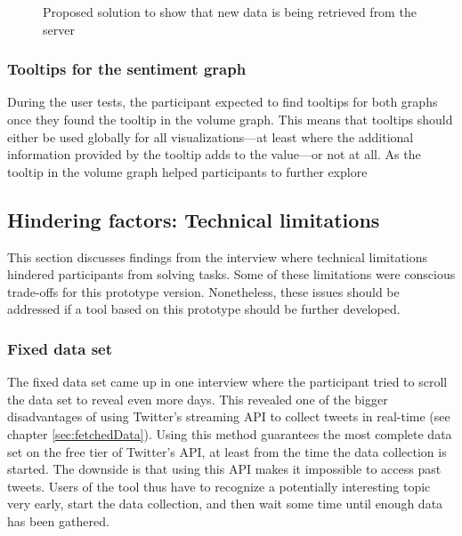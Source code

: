 \begin{figure}[htbp]
    \caption{Proposed solution to show that new data is being retrieved from the server}
    \label{fig:fetching_state}
\end{figure}

\subsubsection*{Tooltips for the sentiment graph}
During the user tests, the participant expected to find tooltips for both graphs once they found the tooltip in the volume graph. This means that tooltips should either be used globally for all visualizations---at least where the additional information provided by the tooltip adds to the value---or not at all. As the tooltip in the volume graph helped participants to further explore 

\subsection{Hindering factors: Technical limitations}
This section discusses findings from the interview where technical limitations hindered participants from solving tasks. Some of these limitations were conscious trade-offs for this prototype version. Nonetheless, these issues should be addressed if a tool based on this prototype should be further developed.

\subsubsection*{Fixed data set}
The fixed data set came up in one interview where the participant tried to scroll the data set to reveal even more days. This revealed one of the bigger disadvantages of using Twitter's streaming API to collect tweets in real-time (see chapter \ref{sec:fetchedData}). Using this method guarantees the most complete data set on the free tier of Twitter's API, at least from the time the data collection is started. The downside is that using this API makes it impossible to access past tweets. Users of the tool thus have to recognize a potentially interesting topic very early, start the data collection, and then wait some time until enough data has been gathered.

